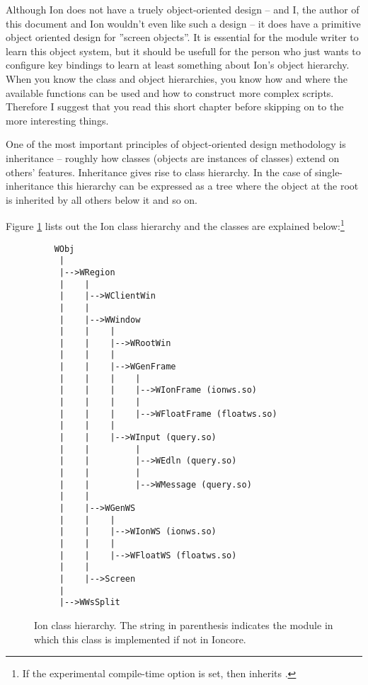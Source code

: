 
\label{chap:prelim}

Although Ion does not have a truely object-oriented design -- and I,
the author of this document and Ion wouldn't even like such a design -- 
it does have a primitive object oriented design for ''screen objects''.
It is essential for the module writer to learn this object system,
but it should be usefull for the person who just wants to configure
key bindings to learn at least something about Ion's object hierarchy.
When you know the class and object hierarchies, you know how and where
the available functions can be used and how to construct more complex
scripts. Therefore I suggest that you read this short chapter before
skipping on to the more interesting things.



One of the most important principles of object-oriented design methodology
is inheritance -- roughly how classes (objects are instances of classes)
extend on others' features. Inheritance gives rise to class hierarchy.
In the case of single-inheritance this hierarchy can be expressed as a
tree where the object at the root is inherited by all others below it
and so on.

Figure \ref{fig:classhierarchy} lists out the Ion class hierarchy and
the classes are explained below:\footnote{If the experimental 
  compile-time option  is set, 
  then inherits .}

\begin{figure}
\begin{verbatim}
    WObj
     |
     |-->WRegion
     |    |
     |    |-->WClientWin
     |    |
     |    |-->WWindow
     |    |    |
     |    |    |-->WRootWin
     |    |    |
     |    |    |-->WGenFrame
     |    |    |    |
     |    |    |    |-->WIonFrame (ionws.so)
     |    |    |    |
     |    |    |    |-->WFloatFrame (floatws.so)
     |    |    |
     |    |    |-->WInput (query.so)
     |    |         |
     |    |         |-->WEdln (query.so)
     |    |         |
     |    |         |-->WMessage (query.so)
     |    |
     |    |-->WGenWS
     |    |    |
     |    |    |-->WIonWS (ionws.so)
     |    |    |
     |    |    |-->WFloatWS (floatws.so)
     |    |
     |    |-->Screen
     |
     |-->WWsSplit
\end{verbatim}
\caption{Ion class hierarchy. The string in parenthesis indicates
  the module in which this class is implemented if not in Ioncore.}
\label{fig:classhierarchy}
\end{figure}

